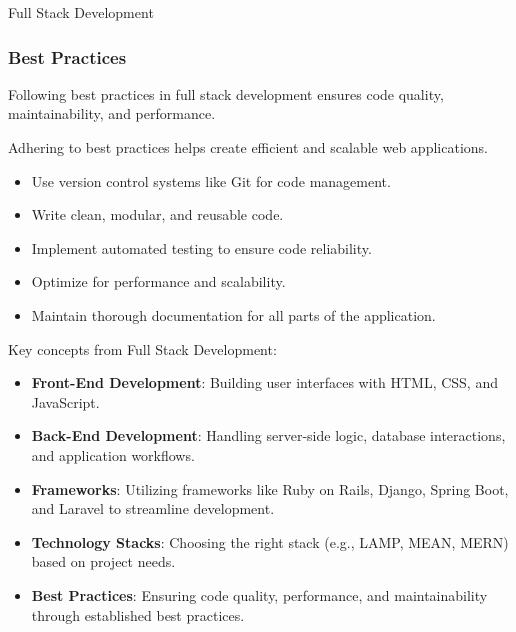 \begin{notes}{Full Stack Development}
\begin{highlight}
    \end{highlight}
    
    \subsubsection*{Best Practices}
    
    Following best practices in full stack development ensures code quality, maintainability, and performance.
    
    \begin{highlight}
    
        Adhering to best practices helps create efficient and scalable web applications.
        
        \begin{itemize}
            \item Use version control systems like Git for code management.
            \item Write clean, modular, and reusable code.
            \item Implement automated testing to ensure code reliability.
            \item Optimize for performance and scalability.
            \item Maintain thorough documentation for all parts of the application.
        \end{itemize}
    
    \end{highlight}
    
    \begin{highlight}
    
        Key concepts from Full Stack Development:
        
        \begin{itemize}
            \item \textbf{Front-End Development}: Building user interfaces with HTML, CSS, and JavaScript.
            \item \textbf{Back-End Development}: Handling server-side logic, database interactions, and application workflows.
            \item \textbf{Frameworks}: Utilizing frameworks like Ruby on Rails, Django, Spring Boot, and Laravel to streamline development.
            \item \textbf{Technology Stacks}: Choosing the right stack (e.g., LAMP, MEAN, MERN) based on project needs.
            \item \textbf{Best Practices}: Ensuring code quality, performance, and maintainability through established best practices.
        \end{itemize}
        
    \end{highlight}
\end{notes}
